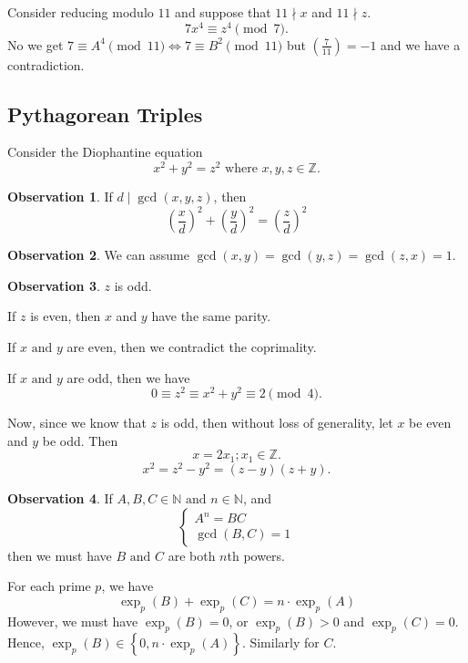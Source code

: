 \documentclass[11pt]{article}
\theoremstyle{definition}
\newtheorem{obs}{Observation}[section]
\newcommand{\legendre}[2]{\left(\frac{#1}{#2}\right)}
\newcommand{\set}[1]{\left\{ #1 \right\}}
\newcommand{\nl}[0]{\vspace{12pt}}
\newcommand{\et}[0]{\text{ and }}
\newcommand{\ZZ}{\mathbb{Z}}
\newcommand{\NN}{\mathbb{N}}
\begin{document}
	Consider reducing modulo $11$ and suppose that $11\nmid x$ and $11\nmid z$. 
	$$ 7x^4 \equiv z^4 \pmod{7} . $$
	No we get $7 \equiv A^4 \pmod{11} \iff 7 \equiv B^2 \pmod{11}$
	but $\legendre{7}{11} = -1$ and we have a contradiction.
\qedhere




\subsection{Pythagorean Triples}

Consider the Diophantine equation
$$ x^2 + y^2 = z^2 \text{ where } x,y,z\in\ZZ. $$

\begin{obs}
	If $d \mid \gcd(x,y,z)$, then 
	$$ \left(\frac{x}{d}\right)^2 + \left(\frac{y}{d}\right)^2 = \left(\frac{z}{d}\right)^2 $$
\end{obs}

\begin{obs}
	We can assume $\gcd(x,y) = \gcd(y,z) = \gcd(z,x) = 1$. 
\end{obs}

\begin{obs}
	$z$ is odd.
\end{obs}
\proof
	If $z$ is even, then $x$ and $y$ have the same parity.

	If $x \et y$ are even, then we contradict the coprimality. 

	If $x \et y$ are odd, then we have 
	$$0 \equiv z^2 \equiv x^2 + y^2 \equiv 2 \pmod{4} . $$
\qedhere

\nl
	Now, since we know that $z$ is odd, then without loss of generality, let $x$ be even and $y$ be odd.
	Then
	$$ x = 2 x_1 ; x_1 \in\ZZ. $$
	$$ x^2 = z^2 - y^2 = (z-y)(z+y) . $$

\begin{obs}
	If $A,B,C\in\NN \et n\in\NN$, and
	$$ \begin{cases} A^n = BC \\ \gcd(B,C) = 1 \end{cases} $$
	then we must have $B \et C$ are both $n$th powers. 
\end{obs}
\proof
	For each prime $p$, we have 
	$$ \exp_p(B) + \exp_p(C) = n \cdot \exp_p(A) $$
	However, we must have $\exp_p(B) = 0$, or $\exp_p(B) > 0$ and $\exp_p(C) = 0$. 
	Hence, $\exp_p(B) \in \set{0, n \cdot \exp_p(A)}$. Similarly for $C$. 
\qedhere
\end{document}
